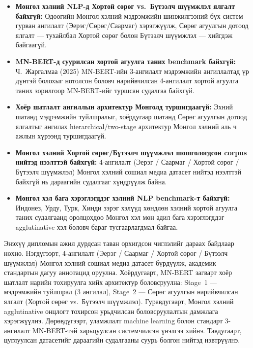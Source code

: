 \begin{itemize}
  \item \textbf{Монгол хэлний NLP-д Хортой сөрөг vs.\ Бүтээлч шүүмжлэл ялгалт байхгүй:}
        Одоогийн Монгол хэлний мэдрэмжийн шинжилгээний бүх систем гурван
        ангилалт (Эерэг/Сөрөг/Саармаг) хэрэгжүүлж, Сөрөг агуулгын дотоод
        ялгалт --- тухайлбал Хортой сөрөг болон Бүтээлч шүүмжлэл ---
        хийгдэж байгаагүй.

  \item \textbf{MN-BERT-д суурилсан хортой агуулга таних benchmark байхгүй:}
        Ч.~Жаргалмаа (2025) MN-BERT-ийн 3-ангилалт мэдрэмжийн ангиллалтад
        үр дүнтэй болохыг нотолсон боловч нарийвчилсан 4-ангилалт хортой
        агуулга таних зорилгоор MN-BERT-ийг туршсан судалгаа байхгүй.

  \item \textbf{Хоёр шатлалт ангиллын архитектур Монголд туршигдаагүй:}
        Эхний шатанд мэдрэмжийн туйлшралыг, хоёрдугаар шатанд Сөрөг
        агуулгын дотоод ялгалтыг ангилах hierarchical/two-stage архитектур
        Монгол хэлний аль ч ажлын хүрээнд туршигдаагүй.

  \item \textbf{Монгол хэлний Хортой сөрөг/Бүтээлч шүүмжлэл шошгологдсон corpus нийтэд
        нээлттэй байхгүй:} 4-ангилалт (Эерэг / Саармаг / Хортой сөрөг /
        Бүтээлч шүүмжлэл) Монгол хэлний сошиал медиа датасет нийтэд
        нээлттэй байхгүй нь дараагийн судалгааг хүндрүүлж байна.

  \item \textbf{Монгол хэл бага хэрэглэгддэг хэлний NLP benchmark-т байхгүй:}
        Индонез, Урду, Турк, Хинди зэрэг хэлүүд хөндлөн хэлний хортой агуулга
        таних судалгаанд оролцохдоо Монгол хэл мөн адил бага хэрэглэгддэг
        agglutinative хэл боловч бараг тусгаарлагдмал байгаа.
\end{itemize}

Энэхүү дипломын ажил дурдсан таван орхигдсон чиглэлийг дараах байдлаар нөхнө. Нэгдүгээрт,
4-ангилалт (Эерэг / Саармаг / Хортой сөрөг / Бүтээлч шүүмжлэл) Монгол
хэлний сошиал медиа датасет бүрдүүлж, академик стандартын дагуу аннотацид
оруулна. Хоёрдугаарт, MN-BERT загварт хоёр шатлалт нарийн тохируулга хийх архитектур
боловсруулна: Stage~1 --- мэдрэмжийн туйлшрал (3 ангилал), Stage~2 --- Сөрөг
агуулгын нарийвчилсан ялгалт (Хортой сөрөг vs.\ Бүтээлч шүүмжлэл). Гуравдугаарт, Монгол
хэлний agglutinative онцлогт тохирсон урьдчилсан боловсруулалтын дамжлага хэрэгжүүлнэ.
Дөрөвдүгээрт, уламжлалт machine learning болон стандарт 3-ангилалт MN-BERT-тэй
харьцуулсан системчилсэн үнэлгээ хийнэ. Тавдугаарт, цуглуулсан датасетийг
дараагийн судалгааны суурь болгон нийтэд нэвтрүүлнэ.

